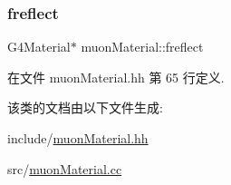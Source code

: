 \subsubsection{\texorpdfstring{freflect}{freflect}}
{\footnotesize\ttfamily G4\+Material$\ast$ muon\+Material\+::freflect\hspace{0.3cm}{\ttfamily [private]}}



在文件 muon\+Material.\+hh 第 65 行定义.



该类的文档由以下文件生成\+:\begin{DoxyCompactItemize}
\item 
include/\hyperlink{muonMaterial_8hh}{muon\+Material.\+hh}\item 
src/\hyperlink{muonMaterial_8cc}{muon\+Material.\+cc}\end{DoxyCompactItemize}
